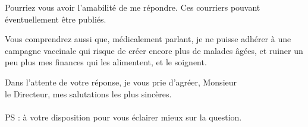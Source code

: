 Pourriez vous avoir l'amabilité de me répondre. Ces courriers pouvant éventuellement être publiés.

Vous comprendrez aussi que, médicalement parlant, je ne puisse adhérer à une campagne vaccinale qui risque de créer encore plus de malades âgées, et ruiner un peu plus mes finances qui les alimentent, et le soignent.

Dans l'attente de votre réponse, je vous prie d'agréer, Monsieur\\
le Directeur, mes salutations les plus sincères.\\

\\

PS : à votre disposition pour vous éclairer mieux sur la question.

